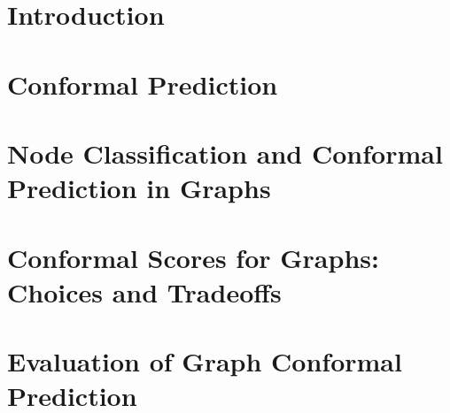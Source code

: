\section{Introduction}


\section{Conformal Prediction}



\section{Node Classification and Conformal Prediction in Graphs}


\section{Conformal Scores for Graphs: Choices and Tradeoffs}


\section{Evaluation of Graph Conformal Prediction}




\begin{subappendices}
    
\end{subappendices}
